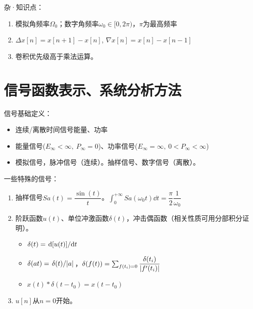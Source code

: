 \documentclass{article}
\begin{document}
\begin{defi}杂·知识点：
	\begin{enumerate}
		\item 模拟角频率$\Omega_0$；数字角频率$\omega_0\in[0,2\pi)$，$\pi$为最高频率
		\item $\Delta x[n]=x[n+1]-x[n]$, $\nabla x[n]=x[n]-x[n-1]$
		\item 卷积优先级高于乘法运算。
	\end{enumerate}
\end{defi}







\newpage
\section{信号函数表示、系统分析方法}
\begin{defi}
	信号基础定义：
	\begin{itemize}
		\item 连续/离散时间信号能量、功率
		\item 能量信号($E_{\infty}<\infty,\ P_\infty=0$)、功率信号($E_\infty=\infty,\ 0<P_\infty<\infty$)
		\item 模拟信号，脉冲信号（连续）。抽样信号、数字信号（离散）。
	\end{itemize}
\end{defi}
\begin{prt}
	一些特殊的信号：
	\begin{enumerate}
		\item 抽样信号$Sa(t)=\dfrac{\sin(t)}{t}$。$\int_0^{+\infty}Sa(\omega_0t)\dd t=\dfrac{\pi}{2}\dfrac{1}{\omega_0}$

		\item 阶跃函数$u(t)$、单位冲激函数$\delta(t)$，冲击偶函数（相关性质可用分部积分证明）。
			\begin{itemize}
				\item $\delta(t)=\dv*{[u(t)]}{t}$
				\item $\delta(at)=\flatfrac{\delta(t)}{\abs{a}}$，$\delta(f(t))=\sum_{f(t_i)=0}\dfrac{\delta(t_i)}{\abs{f'(t_i)}}$
				\item $x(t)*\delta(t-t_0)=x(t-t_0)$
			\end{itemize}
		\item $u[n]$从$n=0$开始。
	\end{enumerate}
\end{prt}
\end{document}
